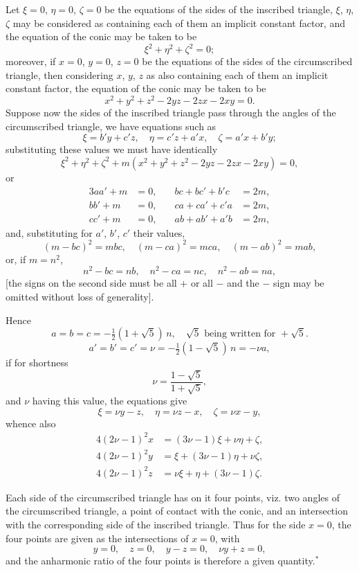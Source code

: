 \documentclass[11pt,a4paper]{book}
\begin{document}
Let $\xi = 0$, $\eta = 0$, $\zeta = 0$ be the equations of the sides of the inscribed triangle, $\xi$, $\eta$, $\zeta$ may be considered as containing each of them an implicit constant factor, and the equation of the conic may be taken to be
\[
\xi^2 + \eta^2 + \zeta^2 = 0;
\]
moreover, if $x = 0$, $y = 0$, $z = 0$ be the equations of the sides of the circumscribed triangle, then considering $x$, $y$, $z$ as also containing each of them an implicit constant factor, the equation of the conic may be taken to be
\[
x^2 + y^2 + z^2 - 2yz - 2zx - 2xy = 0.
\]
Suppose now the sides of the inscribed triangle pass through the angles of the circumscribed triangle, we have equations such as
\[
\xi = b'y + c'z,\quad \eta = c'z + a'x,\quad \zeta = a'x + b'y;
\]
substituting these values we must have identically
\[
\xi^2 + \eta^2 + \zeta^2 + m(x^2 + y^2 + z^2 - 2yz - 2zx - 2xy) = 0,
\]
or
\begin{alignat*}{3}
aa' + m &= 0, &\quad bc + bc' + b'c &= 2m,\\
bb' + m &= 0, &\quad ca + ca' + c'a &= 2m,\\
cc' + m &= 0, &\quad ab + ab' + a'b &= 2m,
\end{alignat*}
and, substituting for $a'$, $b'$, $c'$ their values,
\[
(m - bc)^2 = mbc,\quad (m - ca)^2 = mca,\quad (m - ab)^2 = mab,
\]
or, if $m = n^2$,
\[
n^2 - bc = nb,\quad n^2 - ca = nc,\quad n^2 - ab = na,
\]
[the signs on the second side must be all $+$ or all $-$ and the $-$ sign may be omitted without loss of generality].

Hence
\[
a = b = c = -\tfrac{1}{2}(1 + \sqrt{5})\,n,\quad \sqrt{5}\text{ being written for }+\sqrt{5}.
\]
\[
a' = b' = c' = \nu = -\tfrac{1}{2}(1 - \sqrt{5})\,n = -\nu a,
\]
if for shortness
\[
\nu = \frac{1 - \sqrt{5}}{1 + \sqrt{5}},
\]
and $\nu$ having this value, the equations give
\[
\xi = \nu y - z,\quad \eta = \nu z - x,\quad \zeta = \nu x - y,
\]
whence also
\begin{align*}
4(2\nu - 1)^2x &= (3\nu - 1)\xi + \nu\eta + \zeta,\\
4(2\nu - 1)^2y &= \xi + (3\nu - 1)\eta + \nu\zeta,\\
4(2\nu - 1)^2z &= \nu\xi + \eta + (3\nu - 1)\zeta.
\end{align*}

Each side of the circumscribed triangle has on it four points, viz. two angles of the circumscribed triangle, a point of contact with the conic, and an intersection with the corresponding side of the inscribed triangle. Thus for the side $x = 0$, the four points are given as the intersections of $x = 0$, with
\[
y = 0,\quad z = 0,\quad y - z = 0,\quad \nu y + z = 0,
\]
and the anharmonic ratio of the four points is therefore a given quantity.$^*$
\end{document}
